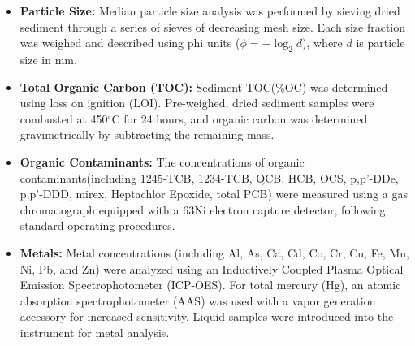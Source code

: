 \begin{itemize}
    \item \textbf{Particle Size:} Median particle size analysis was performed by sieving dried sediment through a series of sieves of decreasing mesh size. Each size fraction was weighed and described using phi units ($\phi = -\log_2 d$), where $d$ is particle size in mm.
    \item \textbf{Total Organic Carbon (TOC):} Sediment TOC(\%OC) was determined using loss on ignition (LOI). Pre-weighed, dried sediment samples were combusted at 450$^\circ$C for 24 hours, and organic carbon was determined gravimetrically by subtracting the remaining mass.
    \item \textbf{Organic Contaminants:} The concentrations of organic contaminants(including 1245-TCB, 1234-TCB, QCB, HCB, OCS, p,p'-DDe, p,p'-DDD, mirex, Heptachlor Epoxide, total PCB)
     were measured using a gas chromatograph equipped with a 63Ni electron capture detector, following standard operating procedures.
    \item \textbf{Metals:} Metal concentrations (including Al, As, Ca, Cd, Co, Cr, Cu, Fe, Mn, Ni, Pb, and Zn) were analyzed using an Inductively Coupled Plasma Optical Emission Spectrophotometer (ICP-OES). For total mercury (Hg), an atomic absorption spectrophotometer (AAS) was used with a vapor generation accessory for increased sensitivity. Liquid samples were introduced into the instrument for metal analysis.
\end{itemize}

